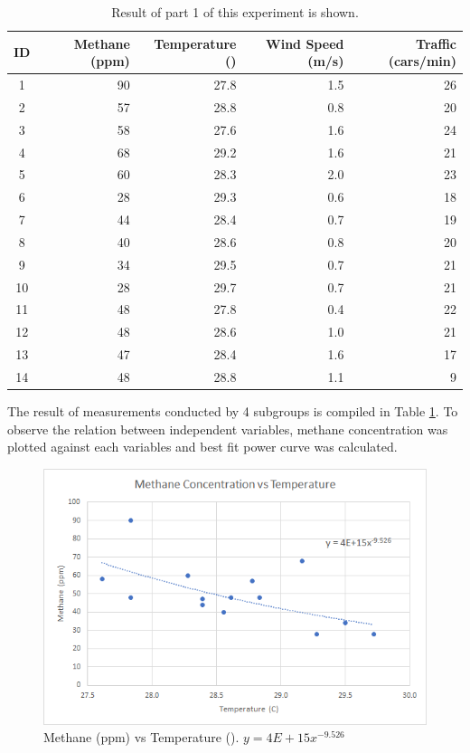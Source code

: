 \documentclass{article}
\begin{document}
\begin{table}[h!]
	\begin{center}
		\begin{tabular}{c|rrrr}
			\textbf{ID} & \textbf{Methane (ppm)} & \textbf{Temperature (\textcelsius)} & \textbf{Wind Speed (m/s)} & \textbf{Traffic (cars/min)} \\ \hline
			1 & 90 & 27.8 & 1.5 & 26 \\
			2 & 57 & 28.8 & 0.8 & 20 \\
			3 & 58 & 27.6 & 1.6 & 24 \\
			4 & 68 & 29.2 & 1.6 & 21 \\
			5 & 60 & 28.3 & 2.0 & 23 \\
			6 & 28 & 29.3 & 0.6 & 18 \\
			7 & 44 & 28.4 & 0.7 & 19 \\
			8 & 40 & 28.6 & 0.8 & 20 \\
			9 & 34 & 29.5 & 0.7 & 21 \\
			10 & 28 & 29.7 & 0.7 & 21 \\
			11 & 48 & 27.8 & 0.4 & 22 \\
			12 & 48 & 28.6 & 1.0 & 21 \\
			13 & 47 & 28.4 & 1.6 & 17 \\
			14 & 48 & 28.8 & 1.1 & 9\\
		\end{tabular}
		\caption[Part 1 Result]{Result of part 1 of this experiment is shown.}
		\label{tab:part1}
	\end{center}
\end{table}

The result of measurements conducted by 4 subgroups is compiled in Table \ref{tab:part1}. To observe the relation between independent variables, methane concentration was plotted against each variables and best fit power curve was calculated.

\begin{figure}[h!]
	\centering
	\includegraphics[width=0.7\linewidth]{part1_temp}
	\caption[Methane vs Temperature]{Methane (ppm) vs Temperature (\textcelsius). $y = 4E+15x^{-9.526}$}
	\label{fig:part1temp}
\end{figure}
\end{document}
